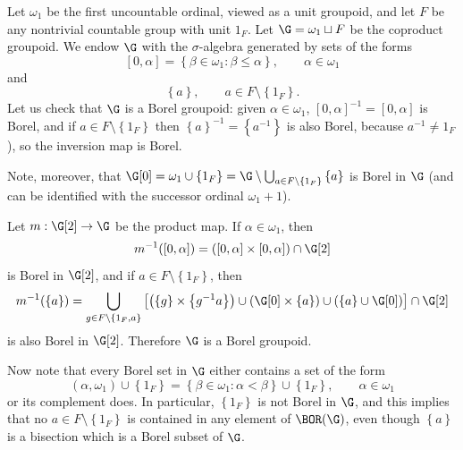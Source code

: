 \begin{example}\label{exampleomega1borelisfunny}
Let $\omega_1$ be the first uncountable ordinal, viewed as a unit groupoid, and let $F$ be any nontrivial countable group with unit $1_F$. Let $\G=\omega_1\sqcup F$ be the coproduct groupoid. We endow $\G$ with the $\sigma$-algebra generated by sets of the forms
\[[0,\alpha]=\left\{\beta\in\omega_1:\beta\leq\alpha\right\},\qquad\alpha\in\omega_1\]
and
\[\left\{a\right\},\qquad a\in F\setminus\left\{1_F\right\}.\]
Let us check that $\G$ is a Borel groupoid: given $\alpha\in\omega_1$, $[0,\alpha]^{-1}=[0,\alpha]$ is Borel, and if $a\in F\setminus\left\{1_F\right\}$ then $\left\{a\right\}^{-1}=\left\{a^{-1}\right\}$ is also Borel, because $a^{-1}\neq 1_F$), so the inversion map is Borel.

Note, moreover, that $\G[0]=\omega_1\cup\left\{1_F\right\}=\G\setminus\bigcup_{a\in F\setminus\left\{1_F\right\}}\left\{a\right\}$ is Borel in $\G$ (and can be identified with the successor ordinal $\omega_1+1$).

Let $m:\G[2]\to \G$ be the product map. If $\alpha\in\omega_1$, then
\[m^{-1}([0,\alpha])=([0,\alpha]\times[0,\alpha])\cap\G[2]\]
is Borel in $\G[2]$, and if $a\in F\setminus\left\{1_F\right\}$, then
\[m^{-1}(\left\{a\right\})=\bigcup_{g\in F\setminus\left\{1_F,a\right\}}\left[\left(\left\{g\right\}\times\left\{g^{-1}a\right\}\right)\cup\left(\G[0]\times\left\{a\right\}\right)\cup\left(\left\{a\right\}\cup\G[0]\right)\right]\cap\G[2]\]
is also Borel in $\G[2]$. Therefore $\G$ is a Borel groupoid.

Now note that every Borel set in $\G$ either contains a set of the form
\[(\alpha,\omega_1)\cup\left\{1_F\right\}=\left\{\beta\in\omega_1:\alpha<\beta\right\}\cup\left\{1_F\right\},\qquad\alpha\in\omega_1\]
or its complement does. In particular, $\left\{1_F\right\}$ is not Borel in $\G$, and this implies that no $a\in F\setminus\left\{1_F\right\}$ is contained in any element of $\BOR(\G)$, even though $\left\{a\right\}$ is a bisection which is a Borel subset of $\G$.
\end{example}


